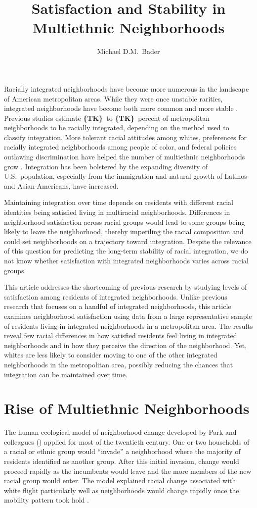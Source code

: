 \documentclass[11pt]{baderart}
\title{Satisfaction and Stability in Multiethnic Neighborhoods}
\author{Michael D.M.~Bader}
\newcommand{\TK}{\textbf{\{TK\}}}
\begin{document}
\maketitle

\noindent Racially integrated neighborhoods have become more numerous in the landscape of American metropolitan areas. While they were once unstable rarities, integrated neighborhoods have become both more common and more stable \needcite. Previous studies estimate \TK\ to \TK\ percent of metropolitan neighborhoods to be racially integrated, depending on the method used to classify integration. More tolerant racial attitudes among whites, preferences for racially integrated neighborhoods among people of color, and federal policies outlawing discrimination have helped the number of multiethnic neighborhoods grow \needcite. Integration has been bolstered by the expanding diversity of U.S.\ population, especially from the immigration and natural growth of Latinos and Asian-Americans, have increased. 

Maintaining integration over time depends on residents with different racial identities being satisfied living in multiracial neighborhoods. Differences in neighborhood satisfaction across racial groups would lead to some groups being likely to leave the neighborhood, thereby imperiling the racial composition and could set neighborhoods on a trajectory toward integration. Despite the relevance of this question for predicting the long-term stability of racial integration, we do not know whether satisfaction with integrated neighborhoods varies across racial groups. 

This article addresses the shortcoming of previous research by studying levels of satisfaction among residents of integrated neighborhoods. Unlike previous research that focuses on a handful of integrated neighborhoods, this article examines neighborhood satisfaction using data from a large representative sample of residents living in integrated neighborhoods in a metropolitan area. The results reveal few racial differences in how satisfied residents feel living in integrated neighborhoods and in how they perceive the direction of the neighborhood. Yet, whites are less likely to consider moving to one of the other integrated neighborhoods in the metropolitan area, possibly reducing the chances that integration can be maintained over time. 

\section{Rise of Multiethnic Neighborhoods}
The human ecological model of neighborhood change developed by Park and colleagues (\needcite) applied for most of the twentieth century. One or two households of a racial or ethnic group would ``invade'' a neighborhood where the majority of residents identified as another group. After this initial invasion, change would proceed rapidly as the incumbents would leave and the more members of the new racial group would enter. The model explained racial change associated with white flight particularly well as neighborhoods would change rapidly once the mobility pattern took hold \needcite. 
\end{document}
